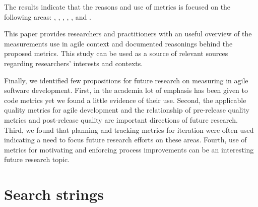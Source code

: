 \documentclass{sig-alternate}
\newcommand{\juha}[1]{\ignorespaces}
\begin{document}
The results indicate that the reasons and use of metrics is focused on the
following areas:
, ,
, ,
,  and
.

This paper provides researchers and practitioners with an useful overview of
the measurements use in agile context and documented reasonings behind the
proposed metrics. This study can be used as a source of relevant sources
regarding researchers' interests and contexts.

Finally, we identified few propositions for future research on measuring in
agile software development. First,  in the academia lot of emphasis has been
given to code metrics yet we found a little evidence of their use. Second,
the applicable quality metrics for agile development and the relationship of
pre-release quality metrics and post-release quality are important directions
of future research. Third, we found that planning and tracking metrics for
iteration were often used indicating a need to focus future research efforts
on these areas. Fourth, use of metrics for motivating and enforcing process
improvements can be an interesting future research topic. 

\juha{muita?} 



%

%
%
\appendix
\section{Search strings}
\label{app:Strings}
\end{document}

